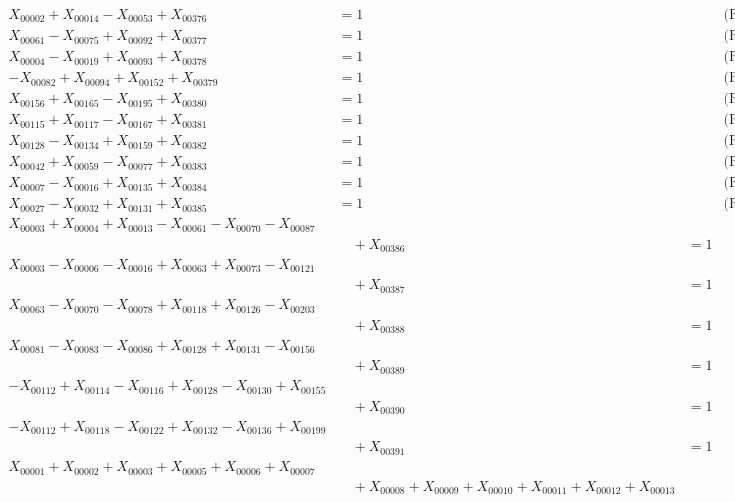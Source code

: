 \documentclass[a4paper,10pt]{article}
\begin{document}
{\begin{align}
X_{00002} + X_{00014} - X_{00053} + X_{00376} &= 1 && \text{(R00145)} \\
X_{00061} - X_{00075} + X_{00092} + X_{00377} &= 1 && \text{(R00146)} \\
X_{00004} - X_{00019} + X_{00093} + X_{00378} &= 1 && \text{(R00147)} \\
-X_{00082} + X_{00094} + X_{00152} + X_{00379} &= 1 && \text{(R00148)} \\
X_{00156} + X_{00165} - X_{00195} + X_{00380} &= 1 && \text{(R00149)} \\
X_{00115} + X_{00117} - X_{00167} + X_{00381} &= 1 && \text{(R00150)} \\
X_{00128} - X_{00134} + X_{00159} + X_{00382} &= 1 && \text{(R00151)} \\
X_{00042} + X_{00059} - X_{00077} + X_{00383} &= 1 && \text{(R00152)} \\
X_{00007} - X_{00016} + X_{00135} + X_{00384} &= 1 && \text{(R00153)} \\
X_{00027} - X_{00032} + X_{00131} + X_{00385} &= 1 && \text{(R00154)} \\
X_{00003} + X_{00004} + X_{00013} - X_{00061} - X_{00070} - X_{00087} \\[0.5ex]
&\quad  + X_{00386} &= 1 && \text{(R00155)} \\
X_{00003} - X_{00006} - X_{00016} + X_{00063} + X_{00073} - X_{00121} \\[0.5ex]
&\quad  + X_{00387} &= 1 && \text{(R00156)} \\
X_{00063} - X_{00070} - X_{00078} + X_{00118} + X_{00126} - X_{00203} \\[0.5ex]
&\quad  + X_{00388} &= 1 && \text{(R00157)} \\
X_{00081} - X_{00083} - X_{00086} + X_{00128} + X_{00131} - X_{00156} \\[0.5ex]
&\quad  + X_{00389} &= 1 && \text{(R00158)} \\
-X_{00112} + X_{00114} - X_{00116} + X_{00128} - X_{00130} + X_{00155} \\[0.5ex]
&\quad  + X_{00390} &= 1 && \text{(R00159)} \\
-X_{00112} + X_{00118} - X_{00122} + X_{00132} - X_{00136} + X_{00199} \\[0.5ex]
&\quad  + X_{00391} &= 1 && \text{(R00160)} \\
\allowbreak
X_{00001} + X_{00002} + X_{00003} + X_{00005} + X_{00006} + X_{00007} \\[0.5ex]
&\quad  + X_{00008} + X_{00009} + X_{00010} + X_{00011} + X_{00012} + X_{00013} \\[0.5ex]

\end{align}}
\end{document}
